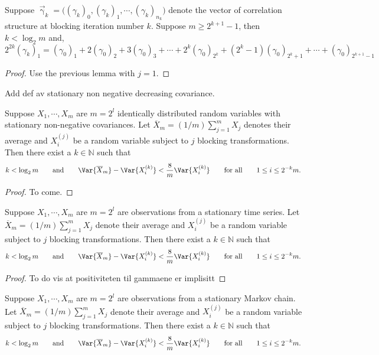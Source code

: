 \documentclass[11pt,english,a4paper]{article}
\begin{document}
\begin{prop}
Suppose $\vec{\upgamma}_k = \big((\gamma_k)_0 , (\gamma_k)_1, \cdots, (\gamma_k)_{n_k}\big)$ denote the vector of correlation structure at blocking iteration number $k$. Suppose $m \geq 2^{k+1} - 1$, then $k < \log_2 m$ and,
\[
2^{  2k}(\gamma_k)_1 = (\gamma_0)_1 + 2(\gamma_0)_2 + 3 (\gamma_0)_3 + \cdots +2^k(\gamma_0)_{2^k} + (2^k-1)(\gamma_0)_{2^k+1} + \cdots + (\gamma_0)_{2^{k+1}-1}
\]
\end{prop}
\begin{proof}
Use the previous lemma with $j=1$.
\end{proof}
Add def av stationary non negative decreasing covariance.
\begin{theorem}
Suppose $X_1,\cdots, X_m$ are $m = 2^l$ identically distributed random variables with stationary non-negative covariances. Let $\overline X_m = (1/m)\sum_{j=1}^m X_j$ denotes their average and $X^{(j)}_i$ be a random variable subject to $j$ blocking transformations. Then there exist a $k \in \mathbb{N}$ such that 
\[
k < \log_2 m \qquad \text{and} \qquad \Var{\overline X_m} - \Var{X^{(k)}_i} < \frac{8}{m}\Var{X^{(k)}_i} \qquad \text{for all} \qquad 1 \leq i \leq 2^{-k}m.
\]
\end{theorem}
\begin{proof}
To come.%
\end{proof}

\begin{corollary}
Suppose $X_1,\cdots, X_m$ are $m = 2^l$ are observations from a stationary time series. Let $\overline X_m = (1/m)\sum_{j=1}^m X_j$ denote their average and $X^{(j)}_i$ be a random variable subject to $j$ blocking transformations. Then there exist a $k \in \mathbb{N}$ such that 
\[
k < \log_2 m \qquad \text{and} \qquad \Var{\overline X_m} - \Var{X^{(k)}_i} < \frac{8}{m}\Var{X^{(k)}_i} \qquad \text{for all} \qquad 1 \leq i \leq 2^{-k}m.
\]
\end{corollary}
\begin{proof}
To do vis at positiviteten til gammaene er implisitt
\end{proof}
\begin{corollary}
Suppose $X_1,\cdots, X_m$ are $m = 2^l$ are observations from a stationary Markov chain. Let $\overline X_m = (1/m)\sum_{j=1}^m X_j$ denote their average and $X^{(j)}_i$ be a random variable subject to $j$ blocking transformations. Then there exist a $k \in \mathbb{N}$ such that 
\[
k < \log_2 m \qquad \text{and} \qquad \Var{\overline X_m} - \Var{X^{(k)}_i} < \frac{8}{m}\Var{X^{(k)}_i} \qquad \text{for all} \qquad 1 \leq i \leq 2^{-k}m.
\]
\end{corollary}
\end{document}
